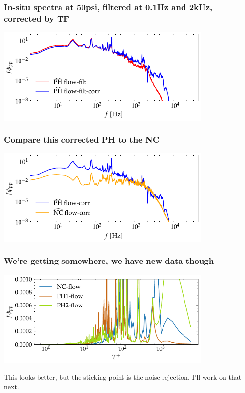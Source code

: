 \documentclass[aspectratio=169,9pt]{beamer}
\begin{document}
\begin{frame}
    \frametitle{In-situ spectra at 50psi, filtered at 0.1Hz and 2kHz, corrected by TF}
        \centering
        \includegraphics[width=0.8\textwidth]{sanity/50psi/PH-NKD/calib_spectra_50psi_f_filt_TF.pdf}
\end{frame}

\begin{frame}
    \frametitle{Compare this corrected PH to the NC}
        \centering
        \includegraphics[width=0.8\textwidth]{sanity/50psi/PH-NKD/calib_spectra_50psi_flow_NC_PH.pdf}
\end{frame}
\begin{frame}
    \frametitle{We're getting somewhere, we have new data though}
        \centering
        \includegraphics[width=0.8\textwidth]{sanity/50psi/03_10/calib_spectra_50psi_f.pdf}
        
        \centering
        This looks better, but the sticking point is the noise rejection. I'll work on that next.
\end{frame}
\end{document}
